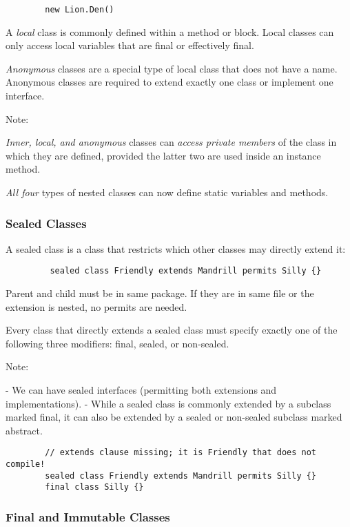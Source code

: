 \documentclass{scrartcl}
\begin{document}
    \begin{lstlisting}
        new Lion.Den()
    \end{lstlisting}

    A \textit{local} class is commonly defined within a method or block.
    Local classes can only access local variables that are final or effectively final.

    \textit{Anonymous} classes are a special type of local class that does not have a name.
    Anonymous classes are required to extend exactly one class or implement one interface.

    Note:

    \textit{Inner, local, and anonymous} classes can \textit{access private members} of the class in which they are defined, provided the latter two are used inside an instance method.

    \textit{All four} types of nested classes can now define static variables and methods.

\subsubsection{Sealed Classes}

    A sealed class is a class that restricts which other classes may directly extend it:

    \begin{lstlisting}
         sealed class Friendly extends Mandrill permits Silly {}
    \end{lstlisting}

    Parent and child must be in same package. If they are in same file or the extension is nested, no permits are needed.

    Every class that directly extends a sealed class must specify exactly one of the following three modifiers: final, sealed, or non-­sealed.

    Note:

    - We can have sealed interfaces (permitting both extensions and implementations).
    - While a sealed class is commonly extended by a subclass marked final, it can also be extended by a sealed or non-­sealed subclass marked abstract.

    \begin{lstlisting}
        // extends clause missing; it is Friendly that does not compile!
        sealed class Friendly extends Mandrill permits Silly {}
        final class Silly {}
    \end{lstlisting}
\subsubsection{Final and Immutable Classes}
\end{document}
